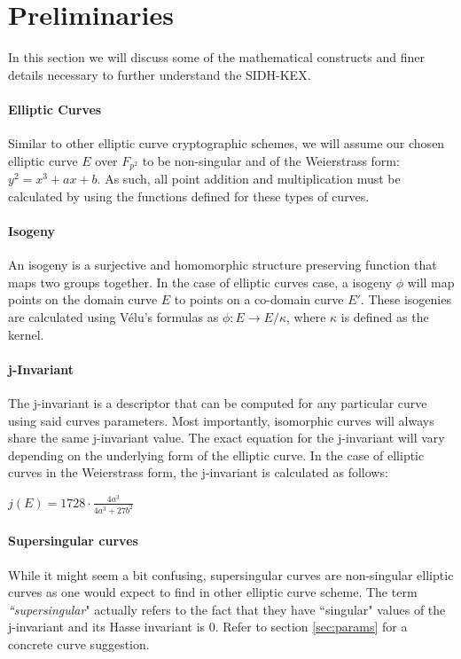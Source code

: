 \documentclass[10pt,twocolumn]{article} %
\begin{document}
\section{Preliminaries}

In this section we will discuss some of the mathematical constructs and finer details necessary to further understand the SIDH-KEX.

\paragraph{Elliptic Curves}
Similar to other elliptic curve cryptographic schemes, we will assume our chosen elliptic curve $E$ over $F_{p^2}$ to be non-singular and of the Weierstrass form: $y^2 = x^3 + ax + b$. As such, all point addition and multiplication must be calculated by using the functions defined for these types of curves.

\paragraph{Isogeny} An isogeny is a surjective and homomorphic structure preserving function that maps two groups together. In the case of elliptic curves case, a  isogeny $\phi$ will map points on the domain curve $E$ to points on a co-domain curve $E'$. These isogenies are calculated using V{\'e}lu's formulas \cite{velu1971isogenies} as $\phi: E \rightarrow E/\kappa$, where $\kappa$ is defined as the kernel.

\paragraph{j-Invariant}
The j-invariant is a descriptor that can be computed for any particular curve using said curves parameters. Most importantly, isomorphic curves will always share the same j-invariant value. The exact equation for the j-invariant will vary depending on the underlying form of the elliptic curve. In the case of elliptic curves in the Weierstrass form, the j-invariant is calculated as follows:

\begin{center}
	\centering
	$j(E)=1728\cdot\frac{4a^3}{4a^3+27b^2}$
\end{center}




\paragraph{Supersingular curves} While it might seem a bit confusing, supersingular curves are non-singular elliptic curves as one would expect to find in other elliptic curve scheme. The term \textit{``supersingular}" actually refers to the fact that they have ``singular" values of the j-invariant and its Hasse invariant is 0. Refer to section \ref{sec:params} for a concrete curve suggestion.
\end{document}
